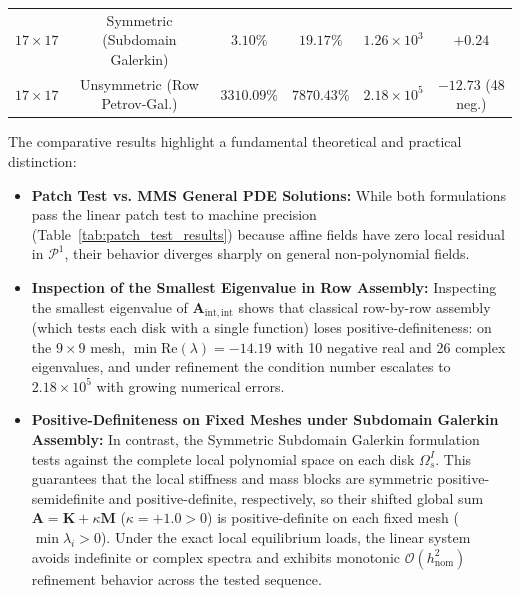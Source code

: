 \documentclass[VANCOUVER,Times1COL]{WileyNJD-v5}
\begin{document}
\begin{table}[!t]
{\begin{tabular}{cccccc}
            \midrule
            $17 \times 17$ & Symmetric (Subdomain Galerkin) & $\mathbf{3.10\%}$                          & $\mathbf{19.17\%}$                             & $1.26 \times 10^3$                                       & $+0.24$                     \\
            $17 \times 17$ & Unsymmetric (Row Petrov-Gal.)  & $3310.09\%$                                & $7870.43\%$                                    & $2.18 \times 10^5$                                       & $-12.73$ (48 neg.)          \\
            \bottomrule
        \end{tabular}
    }
\end{table}

The comparative results highlight a fundamental theoretical and practical distinction:
\begin{itemize}
    \item \textbf{Patch Test vs. MMS General PDE Solutions:} While both formulations pass the linear patch test to machine precision (Table~\ref{tab:patch_test_results}) because affine fields have zero local residual in $\mathcal{P}^1$, their behavior diverges sharply on general non-polynomial fields.
    \item \textbf{Inspection of the Smallest Eigenvalue in Row Assembly:} Inspecting the smallest eigenvalue of $\mathbf{A}_{\mathrm{int}, \mathrm{int}}$ shows that classical row-by-row assembly (which tests each disk with a single function) loses positive-definiteness: on the $9 \times 9$ mesh, $\min\mathrm{Re}(\lambda) = -14.19$ with 10 negative real and 26 complex eigenvalues, and under refinement the condition number escalates to $2.18 \times 10^5$ with growing numerical errors.
    \item \textbf{Positive-Definiteness on Fixed Meshes under Subdomain Galerkin Assembly:} In contrast, the Symmetric Subdomain Galerkin formulation tests against the complete local polynomial space on each disk $\Omega_s^I$. This guarantees that the local stiffness and mass blocks are symmetric positive-semidefinite and positive-definite, respectively, so their shifted global sum $\mathbf{A} = \mathbf{K} + \kappa\mathbf{M}$ ($\kappa = +1.0 > 0$) is positive-definite on each fixed mesh ($\min \lambda_i > 0$). Under the exact local equilibrium loads, the linear system avoids indefinite or complex spectra and exhibits monotonic $\mathcal{O}(h_{\mathrm{nom}}^2)$ refinement behavior across the tested sequence.
\end{itemize}
\end{document}
